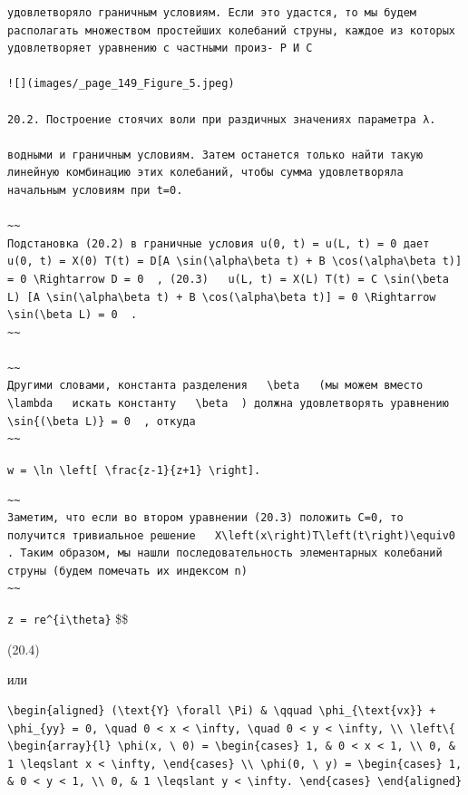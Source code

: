 \documentclass[
  ukrainian,
]{article}
\begin{document}
\begin{verbatim}
удовлетворяло граничным условиям. Если это удастся, то мы будем располагать множеством простейших колебаний струны, каждое из которых удовлетворяет уравнению с частными произ- Р И С

![](images/_page_149_Figure_5.jpeg)

20.2. Построение стоячих воли при раздичных значениях параметра λ.

водными и граничным условиям. Затем останется только найти такую линейную комбинацию этих колебаний, чтобы сумма удовлетворяла начальным условиям при t=0.

~~
Подстановка (20.2) в граничные условия u(0, t) = u(L, t) = 0 дает   u(0, t) = X(0) T(t) = D[A \sin(\alpha\beta t) + B \cos(\alpha\beta t)] = 0 \Rightarrow D = 0  , (20.3)   u(L, t) = X(L) T(t) = C \sin(\beta L) [A \sin(\alpha\beta t) + B \cos(\alpha\beta t)] = 0 \Rightarrow \sin(\beta L) = 0  .
~~

~~
Другими словами, константа разделения   \beta   (мы можем вместо   \lambda   искать константу   \beta  ) должна удовлетворять уравнению   \sin{(\beta L)} = 0  , откуда
~~
\end{verbatim}

\texttt{w\ =\ \textbackslash{}ln\ \textbackslash{}left{[}\ \textbackslash{}frac\{z-1\}\{z+1\}\ \textbackslash{}right{]}.}

\begin{verbatim}
~~
Заметим, что если во втором уравнении (20.3) положить C=0, то получится тривиальное решение   X\left(x\right)T\left(t\right)\equiv0  . Таким образом, мы нашли последовательность элементарных колебаний струны (будем помечать их индексом n)
~~
\end{verbatim}

\texttt{z\ =\ re\^{}\{i\textbackslash{}theta\}} \$\$

(20.4)

или

\begin{verbatim}
\begin{aligned} (\text{Y} \forall \Pi) & \qquad \phi_{\text{vx}} + \phi_{yy} = 0, \quad 0 < x < \infty, \quad 0 < y < \infty, \\ \left\{ \begin{array}{l} \phi(x, \ 0) = \begin{cases} 1, & 0 < x < 1, \\ 0, & 1 \leqslant x < \infty, \end{cases} \\ \phi(0, \ y) = \begin{cases} 1, & 0 < y < 1, \\ 0, & 1 \leqslant y < \infty. \end{cases} \end{aligned}
\end{verbatim}
\end{document}
